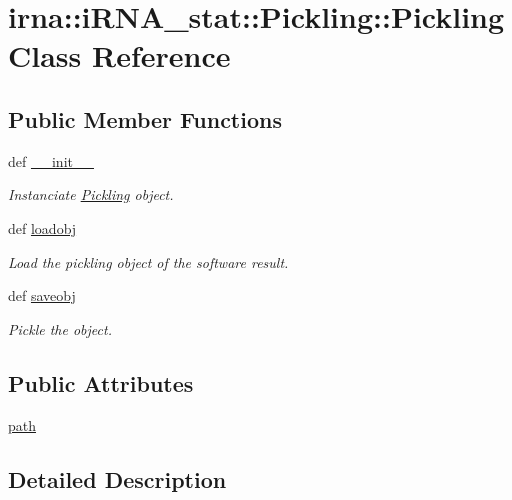 \hypertarget{classirna_1_1iRNA__stat_1_1Pickling_1_1Pickling}{
\section{irna\-:\-:i\-R\-N\-A\-\_\-stat\-:\-:\-Pickling\-:\-:\-Pickling \-Class \-Reference}
\label{classirna_1_1iRNA__stat_1_1Pickling_1_1Pickling}
}
\subsection*{\-Public \-Member \-Functions}
\begin{DoxyCompactItemize}
\item 
def \hyperlink{classirna_1_1iRNA__stat_1_1Pickling_1_1Pickling_a04bed90b143c1231df5ea1444e34bfdb}{\-\_\-\-\_\-init\-\_\-\-\_\-}
\begin{DoxyCompactList}\small\item\em \-Instanciate \hyperlink{classirna_1_1iRNA__stat_1_1Pickling_1_1Pickling}{\-Pickling} object. \end{DoxyCompactList}\item 
def \hyperlink{classirna_1_1iRNA__stat_1_1Pickling_1_1Pickling_ab3c71d52cbd7d7cb6976bf0287b8dcbf}{loadobj}
\begin{DoxyCompactList}\small\item\em \-Load the pickling object of the software result. \end{DoxyCompactList}\item 
def \hyperlink{classirna_1_1iRNA__stat_1_1Pickling_1_1Pickling_a159e51198309fb2b4e9931a23ac967d0}{saveobj}
\begin{DoxyCompactList}\small\item\em \-Pickle the object. \end{DoxyCompactList}\end{DoxyCompactItemize}
\subsection*{\-Public \-Attributes}
\begin{DoxyCompactItemize}
\item 
\hyperlink{classirna_1_1iRNA__stat_1_1Pickling_1_1Pickling_a713b6ebe141dc555ad6abf22940c4c74}{path}
\end{DoxyCompactItemize}


\subsection{\-Detailed \-Description}


